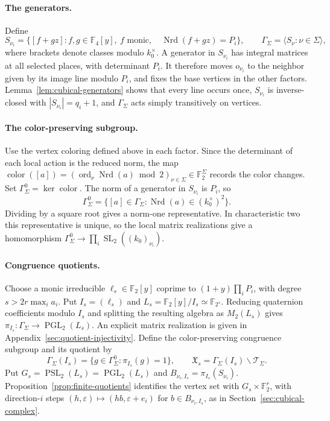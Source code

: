\documentclass[11pt,letterpaper]{article}
\theoremstyle{definition}
\theoremstyle{remark}
\newcommand{\F}{\mathbb F}
\newcommand{\X}{\mathfrak{X}}
\newcommand{\Nrd}{\operatorname{Nrd}}
\newcommand{\SL}{\operatorname{SL}}
\newcommand{\PGL}{\operatorname{PGL}}
\newcommand{\PSL}{\operatorname{PSL}}
\begin{document}
\paragraph{The generators.}
Define
\[
 S_{\nu_i}=\{[f+gz]:f,g\in\F_4[y],\ f\text{ monic},\quad
                         \Nrd(f+gz)=P_i\},\qquad
 \Gamma_\Sigma=\langle S_\nu:\nu\in\Sigma\rangle,
\]
where brackets denote classes modulo $k_0^\times$.
A generator in $S_{\nu_i}$ has integral matrices at all selected
places, with determinant $P_i$. It therefore moves $o_{\nu_i}$
to the neighbor given by its image line modulo $P_i$, and fixes
the base vertices in the other factors.
Lemma~\ref{lem:cubical-generators} shows that every line occurs
once, $S_{\nu_i}$ is inverse-closed with $|S_{\nu_i}|=q_i+1$,
and $\Gamma_\Sigma$ acts simply transitively on vertices.

\paragraph{The color-preserving subgroup.}
Use the vertex coloring defined above in each
factor. Since the determinant of each local action is the reduced norm,
the map
$\operatorname{color}([a])=(\operatorname{ord}_\nu\Nrd(a)\bmod2)_{\nu\in\Sigma}
\in\F_2^\Sigma$ records the color changes.
Set $\Gamma_\Sigma^0=\ker\operatorname{color}$.
The norm of a generator in $S_{\nu_i}$ is $P_i$, so
\begin{equation}
 \Gamma_\Sigma^0
 =\{[a]\in\Gamma_\Sigma:\Nrd(a)\in(k_0^\times)^2\}.
 \label{eq:type-norm-one}
\end{equation}
Dividing by a square root gives a norm-one representative.
In characteristic two this representative
is unique, so the local matrix realizations give a homomorphism
$\Gamma_\Sigma^0\to\prod_i\SL_2((k_0)_{\nu_i})$.


\paragraph{Congruence quotients.}
Choose a monic irreducible $\ell_s\in\F_2[y]$ coprime to
$(1+y)\prod_iP_i$, with degree $s>2r\max_i a_i$.
Put $I_s=(\ell_s)$ and $L_s=\F_2[y]/I_s\simeq\F_{2^s}$.
Reducing quaternion coefficients modulo $I_s$ and splitting the
resulting algebra as $M_2(L_s)$ gives
$\pi_{I_s}:\Gamma_\Sigma\to\PGL_2(L_s)$.
An explicit matrix realization is given in
Appendix~\ref{sec:quotient-injectivity}.
Define the color-preserving congruence subgroup and its quotient by
\[
 \Gamma_\Sigma(I_s)=\{g\in\Gamma_\Sigma^0:\pi_{I_s}(g)=1\},
 \qquad \X_s=\Gamma_\Sigma(I_s)\backslash\mathcal T_\Sigma.
\]
Put $G_s=\PSL_2(L_s)=\PGL_2(L_s)$ and
$B_{\nu_i,I_s}=\pi_{I_s}(S_{\nu_i})$.
Proposition~\ref{prop:finite-quotients} identifies the vertex set
with $G_s\times\F_2^r$, with direction-$i$ steps
$(h,\varepsilon)\mapsto(hb,\varepsilon+e_i)$ for
$b\in B_{\nu_i,I_s}$, as in Section~\ref{sec:cubical-complex}.
\end{document}
